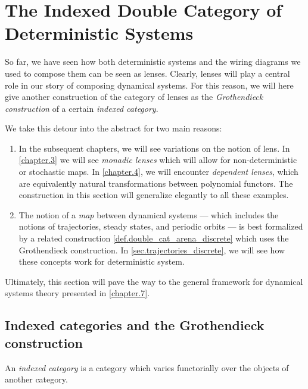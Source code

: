 \documentclass[DynamicalBook]{subfiles}
\begin{document}
\section{The Indexed Double Category of Deterministic Systems}\label{sec.indexed_double_category_of_systems}

  So far, we have seen how both deterministic systems and the wiring diagrams we
  used to compose them can be seen as lenses. Clearly, lenses will play a
  central role in our story of composing dynamical systems. For this reason, we
  will here give another construction of the category of lenses as the
  \emph{Grothendieck construction} of a certain \emph{indexed category}.

  We take this detour into the abstract for two main reasons:
  \begin{enumerate}
    \item In the subsequent chapters, we will see variations on the notion of
      lens. In \cref{chapter.3} we will see \emph{monadic lenses} which
      will allow for non-deterministic or stochastic maps. In \cref{chapter.4},
      we will encounter \emph{dependent lenses}, which are equivalently natural
      transformations between polynomial functors. The construction in this
      section will generalize elegantly to all these examples.
    \item The notion of a \emph{map} between dynamical systems --- which
      includes the notions of trajectories, steady states, and periodic orbits
      --- is best formalized by a related construction \cref{def.double_cat_arena_discrete} which uses the
      Grothendieck construction. In \cref{sec.trajectories_discrete}, we will
      see how these concepts work for deterministic system.
  \end{enumerate}
  Ultimately, this section will pave the way to the general framework for
  dynamical systems theory presented in \cref{chapter.7}.

\subsection{Indexed categories and the Grothendieck construction}\label{sec.indexed_categories}

An \emph{indexed category} is a category which varies functorially over the
objects of another category.
\end{document}
